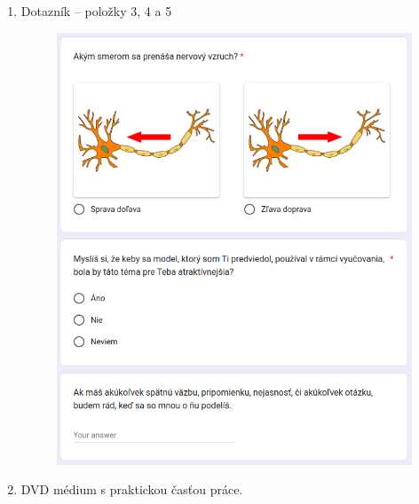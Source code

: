\begin{enumerate}[leftmargin=*]
    \item Dotazník {--} položky 3, 4 a 5 \label{att:dot2}
    \begin{figure}[!htbp]
        \centering
        \includegraphics[width=14cm]{img/dot2.png}
    \end{figure}
    \newpage

    \item DVD médium s praktickou časťou práce.

\end{enumerate}
